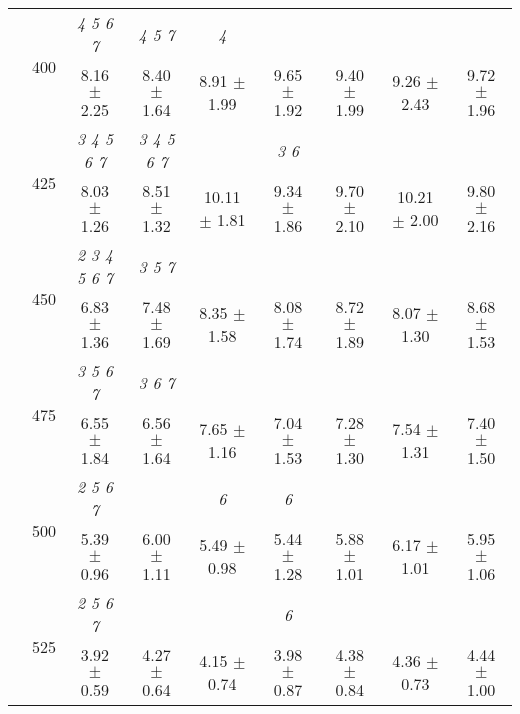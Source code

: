 \begin{table}[h]
{\begin{tabular}{
        ccccccccc}
 & \multirow{2}{*}{400}& \textit{ 4 5 6 7 }& \textit{ 4 5 7 }& \textit{ 4 }& & & &  \\ 
 & & 8.16 $\pm$ 2.25& 8.40 $\pm$ 1.64& 8.91 $\pm$ 1.99& 9.65 $\pm$ 1.92& 9.40 $\pm$ 1.99& 9.26 $\pm$ 2.43& 9.72 $\pm$ 1.96 \\ 
 & \multirow{2}{*}{425}& \cellcolor[HTML]{EFEFEF} \textit{ 3 4 5 6 7 }& \cellcolor[HTML]{EFEFEF} \textit{ 3 4 5 6 7 }& \cellcolor[HTML]{EFEFEF} & \cellcolor[HTML]{EFEFEF} \textit{ 3 6 }& \cellcolor[HTML]{EFEFEF} & \cellcolor[HTML]{EFEFEF} & \cellcolor[HTML]{EFEFEF}  \\ 
 & & \cellcolor[HTML]{EFEFEF} 8.03 $\pm$ 1.26& \cellcolor[HTML]{EFEFEF} 8.51 $\pm$ 1.32& \cellcolor[HTML]{EFEFEF} 10.11 $\pm$ 1.81& \cellcolor[HTML]{EFEFEF} 9.34 $\pm$ 1.86& \cellcolor[HTML]{EFEFEF} 9.70 $\pm$ 2.10& \cellcolor[HTML]{EFEFEF} 10.21 $\pm$ 2.00& \cellcolor[HTML]{EFEFEF} 9.80 $\pm$ 2.16 \\ 
 & \multirow{2}{*}{450}& \textit{ 2 3 4 5 6 7 }& \textit{ 3 5 7 }& & & & &  \\ 
 & & 6.83 $\pm$ 1.36& 7.48 $\pm$ 1.69& 8.35 $\pm$ 1.58& 8.08 $\pm$ 1.74& 8.72 $\pm$ 1.89& 8.07 $\pm$ 1.30& 8.68 $\pm$ 1.53 \\ 
 & \multirow{2}{*}{475}& \cellcolor[HTML]{EFEFEF} \textit{ 3 5 6 7 }& \cellcolor[HTML]{EFEFEF} \textit{ 3 6 7 }& \cellcolor[HTML]{EFEFEF} & \cellcolor[HTML]{EFEFEF} & \cellcolor[HTML]{EFEFEF} & \cellcolor[HTML]{EFEFEF} & \cellcolor[HTML]{EFEFEF}  \\ 
 & & \cellcolor[HTML]{EFEFEF} 6.55 $\pm$ 1.84& \cellcolor[HTML]{EFEFEF} 6.56 $\pm$ 1.64& \cellcolor[HTML]{EFEFEF} 7.65 $\pm$ 1.16& \cellcolor[HTML]{EFEFEF} 7.04 $\pm$ 1.53& \cellcolor[HTML]{EFEFEF} 7.28 $\pm$ 1.30& \cellcolor[HTML]{EFEFEF} 7.54 $\pm$ 1.31& \cellcolor[HTML]{EFEFEF} 7.40 $\pm$ 1.50 \\ 
 & \multirow{2}{*}{500}& \textit{ 2 5 6 7 }& & \textit{ 6 }& \textit{ 6 }& & &  \\ 
 & & 5.39 $\pm$ 0.96& 6.00 $\pm$ 1.11& 5.49 $\pm$ 0.98& 5.44 $\pm$ 1.28& 5.88 $\pm$ 1.01& 6.17 $\pm$ 1.01& 5.95 $\pm$ 1.06 \\ 
 & \multirow{2}{*}{525}& \cellcolor[HTML]{EFEFEF} \textit{ 2 5 6 7 }& \cellcolor[HTML]{EFEFEF} & \cellcolor[HTML]{EFEFEF} & \cellcolor[HTML]{EFEFEF} \textit{ 6 }& \cellcolor[HTML]{EFEFEF} & \cellcolor[HTML]{EFEFEF} & \cellcolor[HTML]{EFEFEF}  \\ 
 & & \cellcolor[HTML]{EFEFEF} 3.92 $\pm$ 0.59& \cellcolor[HTML]{EFEFEF} 4.27 $\pm$ 0.64& \cellcolor[HTML]{EFEFEF} 4.15 $\pm$ 0.74& \cellcolor[HTML]{EFEFEF} 3.98 $\pm$ 0.87& \cellcolor[HTML]{EFEFEF} 4.38 $\pm$ 0.84& \cellcolor[HTML]{EFEFEF} 4.36 $\pm$ 0.73& \cellcolor[HTML]{EFEFEF} 4.44 $\pm$ 1.00 \\ 

\end{tabular}}
\end{table}

